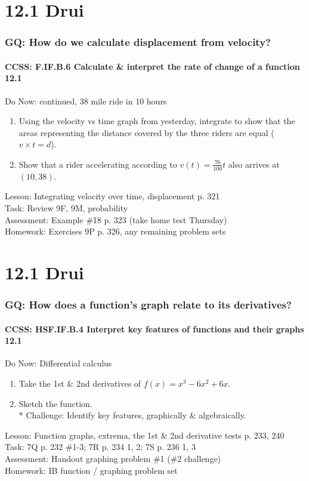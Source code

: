 \documentclass{beamer}
\begin{document}
  \section{12.1 Drui}
  \frame
  {
    \frametitle{GQ: How do we calculate displacement from velocity?}
    \framesubtitle{CCSS: F.IF.B.6 Calculate \& interpret the rate of change of a function \qquad \alert{12.1}}

    \begin{block}{Do Now: continued, 38 mile ride in 10 hours}
    \begin{enumerate}
        \item Using the velocity vs time graph from yesterday, integrate to show that the areas representing the distance covered by the three riders are equal ($v \times t = d$).
        \item Show that a rider accelerating according to $v(t)= \frac{76}{100}t$ also arrives at $(10,38)$.
    \end{enumerate}
    \end{block}
    Lesson: Integrating velocity over time, displacement p. 321\\%
    Task: Review 9F, 9M, probability\\%
    Assessment: Example \#18 p. 323 (take home test Thursday)\\%
    Homework: Exercises 9P p. 326, any remaining problem sets
  }

  \section{12.1 Drui}
  \frame
  {
    \frametitle{GQ: How does a function's graph relate to its derivatives?}
    \framesubtitle{CCSS: HSF.IF.B.4 Interpret key features of functions and their graphs \qquad \alert{12.1}}

    \begin{block}{Do Now: Differential calculus}
    \begin{enumerate}
        \item Take the 1st \& 2nd derivatives of $f(x)=x^3-6x^2+6x$.
        \item Sketch the function.\\*
        Challenge: Identify key features, graphically \& algebraically.
    \end{enumerate}
    \end{block}
    Lesson: Function graphs, extrema, the 1st \& 2nd derivative tests p. 233, 240\\%
    Task: 7Q p. 232 \#1-3; 7R p. 234 1, 2; 7S p. 236 1, 3 \\%
    Assessment: Handout graphing problem \#1 (\#2 challenge)
    \\%
    Homework: IB function / graphing problem set
  }
\end{document}
